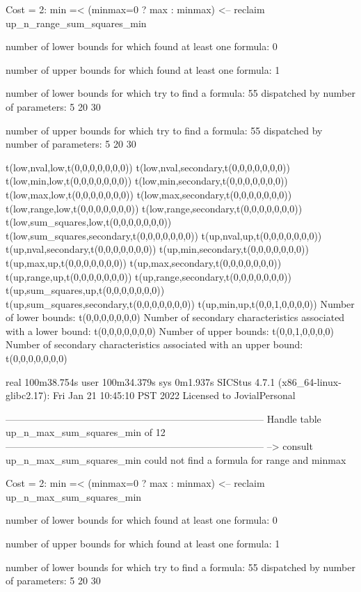 Cost =  2:  min =< (minmax=0 ? max : minmax)
<-- reclaim up_n_range_sum_squares_min

number of lower bounds for which found at least one formula: 0

number of upper bounds for which found at least one formula: 1

number of lower bounds for which try to find a formula: 55
dispatched by number of parameters: 5  20  30

number of upper bounds for which try to find a formula: 55
dispatched by number of parameters: 5  20  30

t(low,nval,low,t(0,0,0,0,0,0,0))
t(low,nval,secondary,t(0,0,0,0,0,0,0))
t(low,min,low,t(0,0,0,0,0,0,0))
t(low,min,secondary,t(0,0,0,0,0,0,0))
t(low,max,low,t(0,0,0,0,0,0,0))
t(low,max,secondary,t(0,0,0,0,0,0,0))
t(low,range,low,t(0,0,0,0,0,0,0))
t(low,range,secondary,t(0,0,0,0,0,0,0))
t(low,sum_squares,low,t(0,0,0,0,0,0,0))
t(low,sum_squares,secondary,t(0,0,0,0,0,0,0))
t(up,nval,up,t(0,0,0,0,0,0,0))
t(up,nval,secondary,t(0,0,0,0,0,0,0))
t(up,min,secondary,t(0,0,0,0,0,0,0))
t(up,max,up,t(0,0,0,0,0,0,0))
t(up,max,secondary,t(0,0,0,0,0,0,0))
t(up,range,up,t(0,0,0,0,0,0,0))
t(up,range,secondary,t(0,0,0,0,0,0,0))
t(up,sum_squares,up,t(0,0,0,0,0,0,0))
t(up,sum_squares,secondary,t(0,0,0,0,0,0,0))
t(up,min,up,t(0,0,1,0,0,0,0))
Number of lower bounds:                                             t(0,0,0,0,0,0,0)
Number of secondary characteristics associated with a lower bound:  t(0,0,0,0,0,0,0)
Number of upper bounds:                                             t(0,0,1,0,0,0,0)
Number of secondary characteristics associated with an upper bound: t(0,0,0,0,0,0,0)

real	100m38.754s
user	100m34.379s
sys	0m1.937s
SICStus 4.7.1 (x86_64-linux-glibc2.17): Fri Jan 21 10:45:10 PST 2022
Licensed to JovialPersonal


--------------------------------------------------------------------------------
Handle table up_n_max_sum_squares_min of 12
--------------------------------------------------------------------------------
--> consult up_n_max_sum_squares_min
could not find a formula for range and minmax

Cost =  2:  min =< (minmax=0 ? max : minmax)
<-- reclaim up_n_max_sum_squares_min

number of lower bounds for which found at least one formula: 0

number of upper bounds for which found at least one formula: 1

number of lower bounds for which try to find a formula: 55
dispatched by number of parameters: 5  20  30

